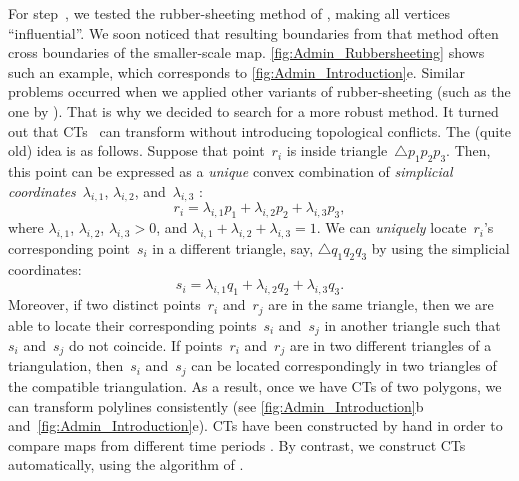 For step~,
we tested the rubber-sheeting method of \textcite{Doytsher2001},
making all vertices ``influential''.  
We soon noticed that resulting boundaries from that method 
often cross boundaries of the smaller-scale map. 
\fig\ref{fig:Admin_Rubbersheeting} shows such an example, 
which corresponds to \fig\ref{fig:Admin_Introduction}e. 
Similar problems occurred 
when we applied other variants of rubber-sheeting
(such as the one by \textcite{Haunert2005Conflation}).
That is why we decided to search for a more robust method.  
It turned out that 
CTs~\parencite{AronovSS93} can 
transform without introducing topological conflicts.  
The (quite old) idea is as follows.  
Suppose that point~$r_i$ is inside triangle~$\triangle{p_1p_2p_3}$. 
Then, this point can be expressed as a
\emph{unique} convex combination of 
\emph{simplicial coordinates}~$\lambda_{i,1}$, 
$\lambda_{i,2}$, and~$\lambda_{i,3}$ 
\parencite{Saalfeld1985-RS}:
\[
r_i=\lambda_{i,1}p_1+\lambda_{i,2}p_2+\lambda_{i,3}p_3,
\]
where $\lambda_{i,1}$, $\lambda_{i,2}$, $\lambda_{i,3}>0$, and
$\lambda_{i,1}+\lambda_{i,2}+\lambda_{i,3}=1$. 
We can \emph{uniquely} locate~$r_i$'s corresponding point~$s_i$ 
in a different triangle, say, $\triangle{q_1q_2q_3}$ 
by using the simplicial coordinates:
\[
s_i=\lambda_{i,1}q_1+\lambda_{i,2}q_2+\lambda_{i,3}q_3.
\]
Moreover, if two distinct points~$r_i$ and~$r_j$ are in the
same triangle, 
then we are able to locate their 
corresponding points~$s_i$ and~$s_j$ in another triangle 
such that~$s_i$ and~$s_j$ do not coincide.
If points~$r_i$ and~$r_j$ are in two different
triangles of a triangulation, 
then~$s_i$ and~$s_j$ can be located correspondingly 
in two triangles of the compatible triangulation. 
As a result, once we have CTs of two 
polygons, we can transform polylines consistently
(see \figs\ref{fig:Admin_Introduction}b 
and~\ref{fig:Admin_Introduction}e). 
CTs have been constructed by hand in order to compare
maps from different time periods \textcite{Fuse2004}. 
By contrast, we construct CTs
automatically, using the algorithm of \textcite{AronovSS93}.


